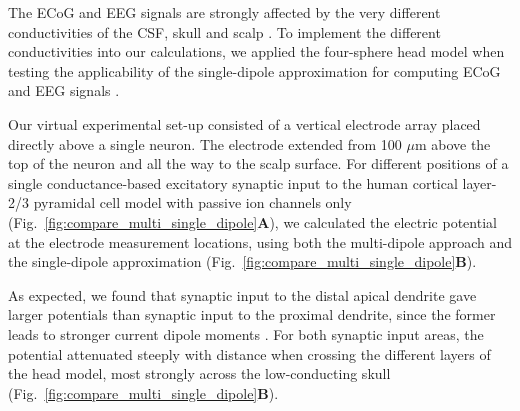 \documentclass[preprint,10pt,authoryear]{elsarticle}
\newcommand{\hlg}[2][Emerald]{ {\sethlcolor{#1} \hl{#2}} }
\newcommand{\sntxt}[1]{{\color{NavyBlue}#1}}
\newcommand{\tvnnote}[1]{\color{white}{\hlg{TVN: #1 }}\color{black}}
\begin{document}


The ECoG and EEG signals are strongly affected by the very different conductivities of the CSF, skull and scalp \citep{NUNEZ2006}. To implement the different conductivities into our calculations, we applied the four-sphere head model when testing the applicability of the single-dipole approximation for computing ECoG and EEG signals \citep{NAESS2017, HAGEN2018, HAGEN2019}.

Our virtual experimental set-up consisted of a vertical electrode array placed directly above a single neuron. The electrode extended from 100 $\mu$m above the top of the neuron and all the way to the scalp surface.
For different positions of a single conductance-based excitatory synaptic input to the human cortical layer-2/3 pyramidal cell model \citep{EYAL2016} \sntxt{with passive ion channels only}
(Fig.~\ref{fig:compare_multi_single_dipole}\textbf{A}), we calculated the electric potential at the electrode measurement locations, using both the multi-dipole approach and the single-dipole approximation (Fig.~\ref{fig:compare_multi_single_dipole}\textbf{B}).


As expected, we found that synaptic input to the distal apical dendrite gave larger potentials than synaptic input to the proximal dendrite, since the former leads to stronger current dipole moments \citep{LINDEN2010, AHLFORS2015}. For both synaptic input areas, the potential attenuated steeply with distance
 when crossing the different layers of the head model, most strongly across the low-conducting skull (Fig.~\ref{fig:compare_multi_single_dipole}\textbf{B}). 
\end{document}

